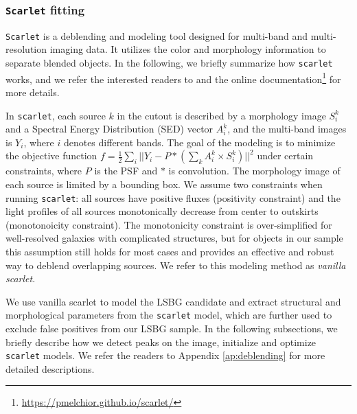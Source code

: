 \documentclass[twocolumn,astrosymb,twocolappendix]{aastex631}
\newcommand{\code}[1]{\texttt{#1}}
\begin{document}
\begin{CJK*}{UTF8}{gbsn}
\subsubsection{\code{Scarlet} fitting}
\code{Scarlet} is a deblending and modeling tool designed for multi-band and multi-resolution imaging data. It utilizes the color and morphology information to separate blended objects. In the following, we briefly summarize how \code{scarlet} works, and we refer the interested readers to \citet{Melchior2018,Melchior2021} and the online documentation\footnote{\url{https://pmelchior.github.io/scarlet/}} for more details. 

In \code{scarlet}, each source $k$ in the cutout is described by a morphology image $S^k_i$ and a Spectral Energy Distribution (SED) vector $A^k_i$, and the multi-band images is $Y_i$, where $i$ denotes different bands. The goal of the modeling is to minimize the objective function $f = \frac{1}{2}\sum_i ||Y_i - P \ast (\sum_k A^k_i\times S^k_i)||^{2}$ under certain constraints, where $P$ is the PSF and $*$ is convolution. The morphology image of each source is limited by a bounding box. We assume two constraints when running \code{scarlet}: all sources have positive fluxes (positivity constraint) and the light profiles of all sources monotonically decrease from center to outskirts (monotonoicity constraint). The monotonicity constraint is over-simplified for well-resolved galaxies with complicated structures, but for objects in our sample this assumption still holds for most cases and provides an effective and robust way to deblend overlapping sources. We refer to this modeling method as \textit{vanilla scarlet}. 


We use vanilla scarlet to model the LSBG candidate and extract structural and morphological parameters from the \code{scarlet} model, which are further used to exclude false positives from our LSBG sample. In the following subsections, we briefly describe how we detect peaks on the image, initialize and optimize \code{scarlet} models. We refer the readers to Appendix \ref{ap:deblending} for more detailed descriptions. 


\end{CJK*}
\end{document}
